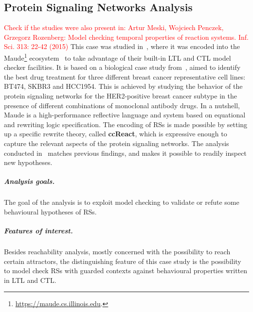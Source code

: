 
\subsection{Protein Signaling Networks Analysis}\label{sec:ccReact}
\textcolor{red}{Check if the studies were also present in: Artur Meski, Wojciech Penczek, Grzegorz Rozenberg: Model checking
temporal properties of reaction systems. Inf. Sci. 313: 22-42 (2015)}
This case was studied in~\cite{DBLP:conf/cmsb/BallisBFO24}, where it was encoded into the Maude\footnote{\url{https://maude.cs.illinois.edu}.} ecosystem~\cite{DBLP:conf/maude/2007} to take advantage of their built-in LTL and CTL model checker facilities. It is based on a biological case study from~\cite{derHeyde2014}, aimed to identify the best drug treatment for three different breast cancer representative cell lines: BT474, SKBR3 and HCC1954. This is achieved by studying the behavior of the protein signaling networks for the HER2-positive breast cancer subtype in the presence of different combinations of monoclonal antibody drugs.
In a nutshell, Maude is a high-performance reflective language and system based on equational and rewriting logic specification. 
The encoding of RSs is made possible by setting up a specific rewrite theory, called \textbf{ccReact}, which is expressive enough to capture the relevant aspects of the protein signaling networks.
The analysis conducted in~\cite{DBLP:conf/cmsb/BallisBFO24} matches previous findings, and makes it possible to readily inspect new hypotheses.

\subparagraph*{Analysis goals.}
The goal of the analysis is to exploit model checking to validate or refute some behavioural hypotheses of RSs.

\subparagraph*{Features of interest.}
Besides reachability analysis, mostly concerned with the possibility to reach certain attractors, the distinguishing feature of this case study is the possibility to model check RSs with guarded contexts against behavioural properties written in LTL and CTL.

